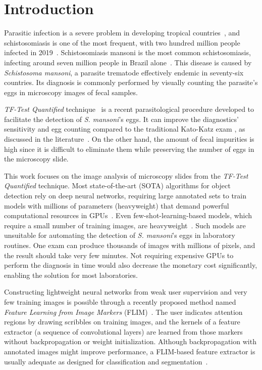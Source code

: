 \documentclass[times,twocolumn,final,authoryear]{elsarticle}
\begin{document}
\section{Introduction}\label{sec:intro}
 Parasitic infection is a severe problem in developing tropical countries~\cite{santos2019tf}, and schistosomiasis is one of the most frequent, with two hundred million people infected in 2019~\cite{WHO}. Schistosomiasis mansoni is the most common schistosomiasis, infecting around seven million people in Brazil alone~\cite{mds2010doenccas}. This disease is caused by \textit{Schistosoma mansoni}, a parasite trematode effectively endemic in seventy-six countries. Its diagnosis is commonly performed by visually counting the parasite's eggs in microscopy images of fecal samples.
    
\textit{TF-Test Quantified} technique~\cite{santos2019tf} is a recent parasitological procedure developed to facilitate the detection of \textit{S. mansoni}'s eggs. It can improve the diagnostics' sensitivity and egg counting compared to the traditional Kato-Katz exam \cite{katz1972simple}, as discussed in the literature~\cite{santos2019tf,carvalho2016tf,kongs2001unreliability}. On the other hand, the amount of fecal impurities is high since it is difficult to eliminate them while preserving the number of eggs in the microscopy slide.

This work focuses on the image analysis of microscopy slides from the \textit{TF-Test Quantified} technique. Most state-of-the-art (SOTA) algorithms for object detection rely on deep neural networks, requiring large annotated sets to train models with millions of parameters (heavyweight) that demand powerful computational resources in GPUs~\cite{zaidi2022survey}. Even few-shot-learning-based models, which require a small number of training images, are heavyweight~\cite{huang2021survey}. Such models are unsuitable for automating the detection of \textit{S. mansoni}'s eggs in laboratory routines. One exam can produce thousands of images with millions of pixels, and the result should take very few minutes. Not requiring expensive GPUs to perform the diagnosis in time would also decrease the monetary cost significantly, enabling the solution for most laboratories.

Constructing lightweight neural networks from weak user supervision and very few training images is possible through a recently proposed method named \textit{Feature Learning from Image Markers} (FLIM)~\cite{de2020feature}. The user indicates attention regions by drawing scribbles on training images, and the kernels of a feature extractor (a sequence of convolutional layers) are learned from those markers without backpropagation or weight initialization. Although backpropagation with annotated images might improve performance, a FLIM-based feature extractor is usually adequate as designed for classification and segmentation~\cite{sousa2021cnn, de2020feature}.
\end{document}
